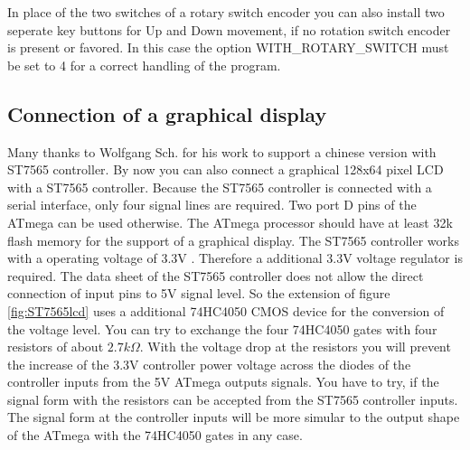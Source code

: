 In place of the two switches of a rotary switch encoder you can also install two seperate
key buttons for Up and Down movement, if no rotation switch encoder is present or favored.
In this case the option WITH\_ROTARY\_SWITCH must be set to 4 for a correct handling of
the program.

\subsection{Connection of a graphical display}

Many thanks to Wolfgang Sch. for his work to support a chinese version with ST7565 controller.
By now you can also connect a graphical 128x64 pixel LCD with a ST7565 controller.
Because the ST7565 controller is connected with a serial interface, only four signal
lines are required. Two port D pins of the ATmega can be used otherwise.
The ATmega processor should have at least 32k flash memory for the support of a graphical display.
The ST7565 controller works with a operating voltage of 3.3V .
Therefore a additional 3.3V voltage regulator is required.
The data sheet of the ST7565 controller does not allow the direct connection of input pins to
5V signal level. So the extension of figure \ref{fig:ST7565lcd} uses a additional 74HC4050 CMOS
device for the conversion of the voltage level.
You can try to exchange the four 74HC4050 gates with four resistors of about \(2.7k\Omega\).
With the voltage drop at the resistors you will prevent the increase of the 3.3V controller power voltage 
across the diodes of the controller inputs from the 5V ATmega outputs signals.
You have to try, if the signal form with the resistors can be accepted from the ST7565 controller inputs.
The signal form at the controller inputs will be more simular to the output shape of the ATmega with the 74HC4050 gates in any case.\\

